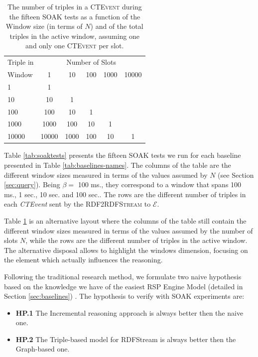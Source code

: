 \begin{table}[htb]
	\centering
	\normalsize
	\begin{tabular}{l | ccccc} %
	  	\hline
		Triple in & \multicolumn{5}{c}{Number of Slots}  \\
		Window  & 1 & 10 & 100 & 1000&10000\\
		\hline
		1  	 & 1\\
		10   & 10  & 1 \\
		100  & 100 & 10 & 1\\
		1000 & 1000& 100& 10& 1\\
		10000& 10000 & 1000& 100& 10& 1\\
		\hline %
	 \end{tabular}
	\caption{The number of triples in a \textsc{CTEvent} during the fifteen SOAK tests as a function of the Window size (in terms of $N$) and of the total triples in the active window, assuming one and only one \textsc{CTEvent} per slot.}
	\label{tab:soaktests-alt}
\end{table}

Table \ref{tab:soaktests} presents the fifteen SOAK tests we run for each baseline presented in Table \ref{tab:baselines-names}. The columns of the table are the different window sizes measured in terms of the values assumed by $N$ (see Section \ref{sec:query}).  Being $\beta=$ 100 ms., they correspond to a window that spans 100 ms., 1 sec., 10 sec. and 100 sec.. The rows are the different number of triples in each \textit{CTEvent} sent by the \textsc{RDF2RDFStream} to $\mathcal{E}$.%

Table \ref{tab:soaktests-alt} is an alternative layout where the columns of the table still contain the different window sizes measured in terms of the values assumed by the number of slots $N$, while the rows are the different number of triples in the active window. The alternative disposal allows to highlight the windows dimension, focusing on the element which actually influences the reasoning.

Following the traditional research method, we formulate two naive hypothesis based on the knowledge we have of the easiest RSP Engine Model (detailed in Section \ref{sec:baselines}) . The hypothesis to verify with SOAK experiments are:
\begin{itemize}
\item \textbf{HP.1} The Incremental reasoning approach is always better then the naive one.
\item \textbf{HP.2} The Triple-based model for RDFStream is always better then the Graph-based one.
\end{itemize}


